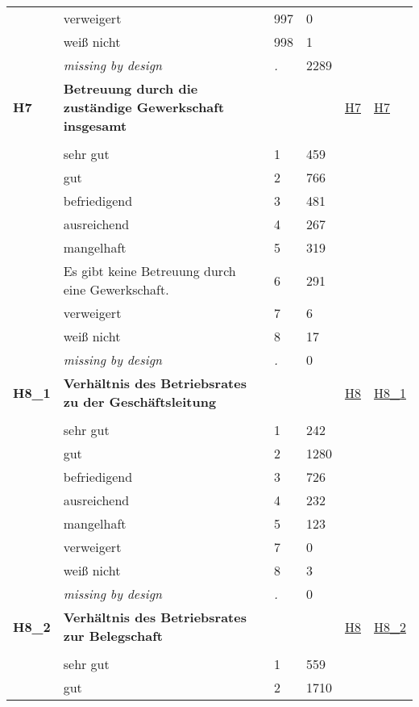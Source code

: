 \begin{longtable}{| L{2.45cm} | L{6cm} | C{1.5cm} | R{1cm} | C{2.25cm} | C{2.25cm} |}
   & verweigert & 997 & 0 &  &  \\ 
   & weiß nicht & 998 & 1 &  &  \\ 
   & \textit{missing by design} & \textit{.} & 2289 &  &  \\ 
   \midrule
\textbf{H7}\label{var:H7} & \textbf{Betreuung durch die zuständige Gewerkschaft insgesamt} &  &  & \hyperref[H7]{H7} & \hyperref[var:suf:H7]{H7} \\ 
   &  &  &  &  &  \\ 
   & sehr gut & 1 & 459 &  &  \\ 
   & gut & 2 & 766 &  &  \\ 
   & befriedigend & 3 & 481 &  &  \\ 
   & ausreichend & 4 & 267 &  &  \\ 
   & mangelhaft & 5 & 319 &  &  \\ 
   & Es gibt keine Betreuung durch eine Gewerkschaft. & 6 & 291 &  &  \\ 
   & verweigert & 7 & 6 &  &  \\ 
   & weiß nicht & 8 & 17 &  &  \\ 
   & \textit{missing by design} & \textit{.} & 0 &  &  \\ 
   \midrule
\textbf{H8\_1}\label{var:H8:1} & \textbf{Verhältnis des Betriebsrates zu der Geschäftsleitung} &  &  & \hyperref[H8]{H8} & \hyperref[var:suf:H8:1]{H8\_1} \\ 
   &  &  &  &  &  \\ 
   & sehr gut & 1 & 242 &  &  \\ 
   & gut & 2 & 1280 &  &  \\ 
   & befriedigend & 3 & 726 &  &  \\ 
   & ausreichend & 4 & 232 &  &  \\ 
   & mangelhaft & 5 & 123 &  &  \\ 
   & verweigert & 7 & 0 &  &  \\ 
   & weiß nicht & 8 & 3 &  &  \\ 
   & \textit{missing by design} & \textit{.} & 0 &  &  \\ 
   \midrule
\textbf{H8\_2}\label{var:H8:2} & \textbf{Verhältnis des Betriebsrates zur Belegschaft} &  &  & \hyperref[H8]{H8} & \hyperref[var:suf:H8:2]{H8\_2} \\ 
   &  &  &  &  &  \\ 
   & sehr gut & 1 & 559 &  &  \\ 
   & gut & 2 & 1710 &  &  \\ 

\end{longtable}
